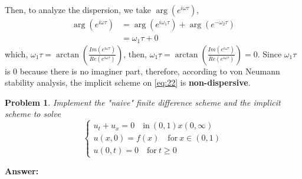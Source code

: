 \documentclass[a4paper,12pt]{article}
\newtheorem{prob}{Problem}[]
\begin{document}
\begin{enumerate}
	Then, to analyze the dispersion, we take $\arg(e^{i\omega\tau})$,
	\begin{equation}\label{eq:28}
	\begin{aligned}
	\arg(e^{i\omega\tau}) &= \arg(e^{i\omega_1\tau}) + \arg(e^{-\omega_2\tau})\\
	&= \omega_1\tau + 0
	\end{aligned}
	\end{equation}
	which, $\omega_1\tau = \arctan\left(\frac{Im(e^{i\omega \tau})}{Re(e^{i\omega \tau})}\right)$,
	then, $\omega_1\tau = \arctan\left(\frac{Im(e^{i\omega \tau})}{Re(e^{i\omega \tau})}\right) = 0$. Since $\omega_1\tau$ is 0 because there is no imaginer part, therefore, according to von Neumann stability analysis, the implicit scheme on \eqref{eq:22} is \textbf{non-dispersive}.
\end{enumerate}
\newpage
\begin{prob}
	Implement the "naive" finite difference scheme and the implicit scheme to solve
	\begin{equation}\label{eq:35}
	\begin{cases}
	u_t + u_x = 0 \quad \text{in}\ (0,1) x (0,\infty)\\
	u(x,0) = f(x) \quad \text{for}\ x\in (0,1)\\
	u(0,t) = 0 \quad \text{for}\ t\geq 0
	\end{cases}
	\end{equation}
\end{prob}
\textbf{Answer:}
\end{document}
